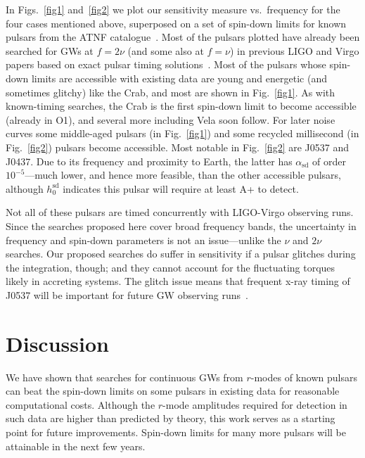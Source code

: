 \documentclass{ttuthes2007}
\begin{document}
In Figs.~\ref{fig1} and~\ref{fig2} we plot our sensitivity measure vs.\
frequency for the four cases mentioned above, superposed on a set of spin-down
limits for known pulsars from the ATNF catalogue~\cite{Manchester:2004bp}.
Most of the pulsars plotted have already been searched for \acp{GW} at
$f=2\nu$ (and some also at $f=\nu$) in previous LIGO and Virgo papers based on
exact pulsar timing solutions~\cite{Authors:2019ztc}.
Most of the pulsars whose spin-down limits are accessible with existing data
are young and energetic (and sometimes glitchy) like the Crab, and most are
shown in Fig.~\ref{fig1}.
As with known-timing searches, the Crab is the first spin-down limit to become
accessible (already in \ac{O1}), and several more including Vela soon follow.
For later noise curves some middle-aged pulsars (in Fig.~\ref{fig1}) and some
recycled millisecond (in Fig.~\ref{fig2}) pulsars become accessible.
Most notable in Fig.~\ref{fig2} are J0537\textminus6910 and
J0437.
Due to its frequency and proximity to Earth, the latter has
$\alpha_\mathrm{sd}$ of order $10^{-5}$---much lower, and hence more feasible,
than the other accessible pulsars, although $h_0^\mathrm{sd}$ indicates this
pulsar will require at least A+ to detect.

Not all of these pulsars are timed concurrently with LIGO-Virgo observing
runs.
Since the searches proposed here cover broad frequency bands, the uncertainty
in frequency and spin-down parameters is not an issue---unlike the $\nu$ and
$2\nu$ searches.
Our proposed searches do suffer in sensitivity if a pulsar glitches during the
integration, though; and they cannot account for the fluctuating torques
likely in accreting systems.
The glitch issue means that frequent x-ray timing of J0537 will
be important for future \ac{GW} observing runs~\cite{Andersson:2017fow}.

\section{Discussion}

We have shown that searches for continuous \acp{GW} from $r$-modes of known
pulsars can beat the spin-down limits on some pulsars in existing data for
reasonable computational costs.
Although the $r$-mode amplitudes required for detection in such data are
higher than predicted by theory, this work serves as a starting point for
future improvements.
Spin-down limits for many more pulsars will be attainable in the next few
years.
\end{document}
